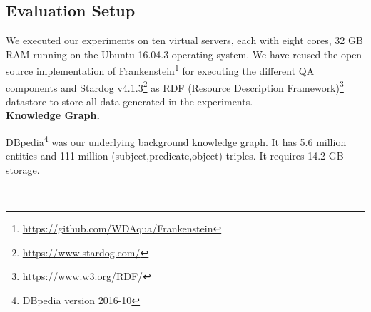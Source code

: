 \documentclass[sigconf,edbt]{acmart-edbt2019}
\begin{document}
\subsection{Evaluation Setup} \label{sec:experimentalsetup}
We executed our experiments on ten virtual servers, each with eight cores, 32 GB RAM running on the Ubuntu 16.04.3 operating system. We have reused the open source implementation of Frankenstein\footnote{\url{https://github.com/WDAqua/Frankenstein}} for executing the different QA components and Stardog v4.1.3\footnote{\url{https://www.stardog.com/}} as RDF (Resource Description Framework)\footnote{\url{https://www.w3.org/RDF/}} datastore to store all data generated in the experiments.
~\\
{\bf Knowledge Graph.} \begin{inparaenum}
DBpedia\footnote{DBpedia version 2016-10} \cite{DBLP:conf/semweb/AuerBKLCI07} was our underlying background knowledge graph. It has 5.6 million entities and 111 million (subject,predicate,object) triples. It requires 14.2 GB storage.
\end{inparaenum}
~\\
\end{document}
